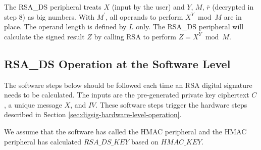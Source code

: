 \documentclass[main\_\_EN.tex]{subfiles}
\begin{document}
\begin{enumerate}
        The RSA\_DS peripheral treats \begin{math}X\end{math} (input by the user) and \begin{math}Y\end{math}, \begin{math}M\end{math}, \begin{math}\overline{r}\end{math} (decrypted in step 8) as big numbers. With \begin{math}M^{\prime}\end{math}, all operands to perform \begin{math} X^{Y} \bmod M\end{math} are in place. The operand length is defined by \begin{math}L\end{math} only. The RSA\_DS peripheral will calculate the signed result \begin{math}Z\end{math} by calling RSA to perform \begin{math}Z = X^{Y} \bmod M\end{math}.

\end{enumerate}

\subsection{RSA\_DS Operation at the Software Level}

The software steps below should be followed each time an RSA digital signature needs to be calculated. The inputs are the pre-generated private key ciphertext \begin{math}C\end{math}, a unique message \begin{math}X\end{math}, and \begin{math}IV\end{math}. These software steps trigger the hardware steps described in Section \ref{sec:digsig-hardware-level-operation}.

We assume that the software has called the HMAC peripheral and the HMAC peripheral has calculated \begin{math}RSA\_DS\_KEY\end{math} based on \begin{math}HMAC\_KEY\end{math}.
\end{document}
